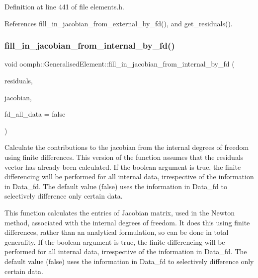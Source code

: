 Definition at line 441 of file elements.\+h.



References fill\+\_\+in\+\_\+jacobian\+\_\+from\+\_\+external\+\_\+by\+\_\+fd(), and get\+\_\+residuals().

\mbox{\label{classoomph_1_1GeneralisedElement_a3409d6da14739827766547c7338360e3}} 
\subsubsection{\texorpdfstring{fill\+\_\+in\+\_\+jacobian\+\_\+from\+\_\+internal\+\_\+by\+\_\+fd()}{fill\_in\_jacobian\_from\_internal\_by\_fd()}\hspace{0.1cm}{\footnotesize\ttfamily [1/2]}}
{\footnotesize\ttfamily void oomph\+::\+Generalised\+Element\+::fill\+\_\+in\+\_\+jacobian\+\_\+from\+\_\+internal\+\_\+by\+\_\+fd (\begin{DoxyParamCaption}\item[{\hyperlink{classoomph_1_1Vector}{Vector}$<$ double $>$ \&}]{residuals,  }\item[{\hyperlink{classoomph_1_1DenseMatrix}{Dense\+Matrix}$<$ double $>$ \&}]{jacobian,  }\item[{const bool \&}]{fd\+\_\+all\+\_\+data = {\ttfamily false} }\end{DoxyParamCaption})\hspace{0.3cm}{\ttfamily [protected]}}



Calculate the contributions to the jacobian from the internal degrees of freedom using finite differences. This version of the function assumes that the residuals vector has already been calculated. If the boolean argument is true, the finite differencing will be performed for all internal data, irrespective of the information in Data\+\_\+fd. The default value (false) uses the information in Data\+\_\+fd to selectively difference only certain data. 

This function calculates the entries of Jacobian matrix, used in the Newton method, associated with the internal degrees of freedom. It does this using finite differences, rather than an analytical formulation, so can be done in total generality. If the boolean argument is true, the finite differencing will be performed for all internal data, irrespective of the information in Data\+\_\+fd. The default value (false) uses the information in Data\+\_\+fd to selectively difference only certain data. 

